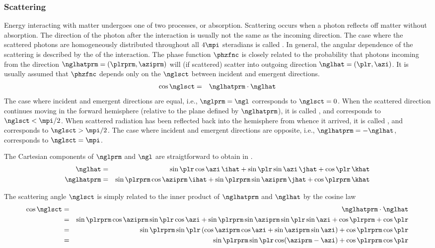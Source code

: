 \documentclass[12pt]{article}
\begin{document}
\subsubsection[Scattering]{Scattering}\label{sxn:sct}
Energy interacting with matter undergoes one of two processes,
 or absorption.
Scattering occurs when a photon reflects off matter without
absorption. 
The direction of the photon after the interaction is usually not the
same as the incoming direction.
The case where the scattered photons are homogeneously distributed
throughout all $4\mpi$ steradians is called . 
In general, the angular dependence of the scattering is described by
the  of the interaction. 
The phase function $\phzfnc$ is closely related to the probability
that photons incoming from the direction $\nglhatprm =
(\plrprm,\aziprm)$ will (if scattered) scatter into outgoing
direction $\nglhat = (\plr,\azi)$. 
It is usually assumed that $\phzfnc$ depends only on the
$\nglsct$ between incident and emergent directions.
\begin{eqnarray}
\cos \nglsct & = & \nglhatprm \cdot \nglhat
\label{eqn:ngl_sct_dfn}
\end{eqnarray}
The case where incident and emergent directions are equal, i.e.,
$\nglprm = \ngl$ corresponds to $\nglsct = 0$.
When the scattered direction continues moving in the forward
hemisphere (relative to the plane defined by $\nglhatprm$), it is called
, and corresponds to $\nglsct < \mpi/2$.
When scattered radiation has been reflected back into the
hemisphere from whence it arrived, it is called , and corresponds to $\nglsct > \mpi/2$. 
The case where incident and emergent directions are opposite, i.e.,
$\nglhatprm = -\nglhat$, corresponds to $\nglsct = \mpi$.

The Cartesian components of $\nglprm$ and $\ngl$ are straigtforward to
obtain in .
\begin{eqnarray}
\nglhat & = & \sin \plr \cos \azi \, \ihat + \sin \plr \sin \azi \, \jhat +
\cos \plr \, \khat \\
\nglhatprm & = & \sin \plrprm \cos \aziprm \, \ihat + \sin \plrprm \sin
\aziprm \, \jhat + \cos \plrprm \, \khat
\label{eqn:ngl_crt_dfn}
\end{eqnarray}

The scattering angle $\nglsct$ is simply related to the inner product 
of $\nglhatprm$ and $\nglhat$ by the cosine law
\begin{eqnarray}
\cos \nglsct & = & \nglhatprm \cdot \nglhat \nonumber \\
& = & \sin \plrprm \cos \aziprm \sin \plr \cos \azi + \sin \plrprm
\sin \aziprm \sin \plr \sin \azi + \cos \plrprm + \cos \plr \nonumber \\
& = & \sin \plrprm \sin \plr \, ( \cos \aziprm \cos \azi + \sin \aziprm
\sin \azi ) + \cos \plrprm \cos \plr \nonumber \\
& = & \sin \plrprm \sin \plr \cos (\aziprm - \azi) + \cos \plrprm \cos \plr 
\label{eqn:ngl_sct_dfn2}
\end{eqnarray}
\end{document}
